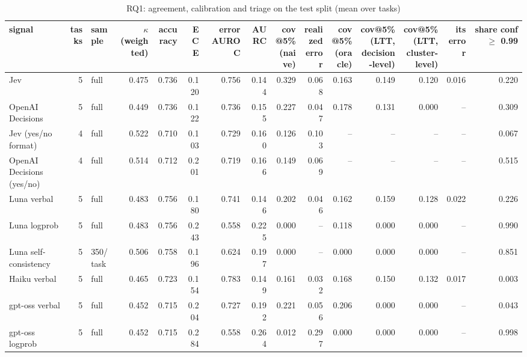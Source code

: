 \begin{table}[t]
\centering
\small
\caption{RQ1: agreement, calibration and triage on the test split (mean over tasks)}
\label{tab:tab03_rq1_signals}
\begin{adjustbox}{max width=\linewidth}
\begin{tabular}{lrlrrrrrrrrrrrr}
\toprule
signal & tasks & sample & $\kappa$ (weighted) & accuracy & ECE & error AUROC & AURC & \makecell[br]{cov@5\% \\{} (naive)} & \makecell[br]{realized \\{} error} & \makecell[br]{cov@5\% \\{} (oracle)} & \makecell[br]{cov@5\% (LTT, \\{} decision-level)} & \makecell[br]{cov@5\% (LTT, \\{} cluster-level)} & its error & \makecell[br]{share conf $\geq$ \\{} 0.99} \\
\midrule
Jev & 5 & full & 0.475 & 0.736 & 0.120 & 0.756 & 0.144 & 0.329 & 0.068 & 0.163 & 0.149 & 0.120 & 0.016 & 0.220 \\
OpenAI Decisions & 5 & full & 0.449 & 0.736 & 0.122 & 0.736 & 0.155 & 0.227 & 0.047 & 0.178 & 0.131 & 0.000 & -- & 0.309 \\
Jev (yes/no format) & 4 & full & 0.522 & 0.710 & 0.103 & 0.729 & 0.160 & 0.126 & 0.103 & -- & -- & -- & -- & 0.067 \\
OpenAI Decisions (yes/no) & 4 & full & 0.514 & 0.712 & 0.201 & 0.719 & 0.166 & 0.149 & 0.069 & -- & -- & -- & -- & 0.515 \\
Luna verbal & 5 & full & 0.483 & 0.756 & 0.180 & 0.741 & 0.146 & 0.202 & 0.046 & 0.162 & 0.159 & 0.128 & 0.022 & 0.226 \\
Luna logprob & 5 & full & 0.483 & 0.756 & 0.243 & 0.558 & 0.225 & 0.000 & -- & 0.118 & 0.000 & 0.000 & -- & 0.990 \\
Luna self-consistency & 5 & 350/task & 0.506 & 0.758 & 0.196 & 0.624 & 0.197 & 0.000 & -- & 0.000 & 0.000 & 0.000 & -- & 0.851 \\
Haiku verbal & 5 & full & 0.465 & 0.723 & 0.154 & 0.783 & 0.149 & 0.161 & 0.032 & 0.168 & 0.150 & 0.132 & 0.017 & 0.003 \\
gpt-oss verbal & 5 & full & 0.452 & 0.715 & 0.204 & 0.727 & 0.192 & 0.221 & 0.056 & 0.206 & 0.000 & 0.000 & -- & 0.043 \\
gpt-oss logprob & 5 & full & 0.452 & 0.715 & 0.284 & 0.558 & 0.264 & 0.012 & 0.297 & 0.000 & 0.000 & 0.000 & -- & 0.998 \\

\end{tabular}
\end{adjustbox}
\end{table}
